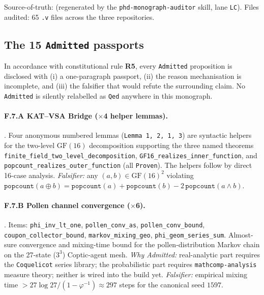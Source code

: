 Source-of-truth:  (regenerated by
the \texttt{phd-monograph-auditor} skill, lane \texttt{LC}). Files audited:
65 \texttt{.v} files across the three repositories.

\subsection{The 15 \texttt{Admitted} passports}

In accordance with constitutional rule \textbf{R5}, every \texttt{Admitted}
proposition is disclosed with (i) a one-paragraph passport, (ii) the reason
mechanisation is incomplete, and (iii) the falsifier that would refute the
surrounding claim. No \texttt{Admitted} is silently relabelled as
\texttt{Qed} anywhere in this monograph.

\paragraph{F.7.A KAT--VSA Bridge ($\times$4 helper lemmas).}
. Four anonymous numbered lemmas
(\texttt{Lemma 1, 2, 1, 3}) are syntactic helpers for the two-level
$\mathrm{GF}(16)$ decomposition supporting the three named theorems
\texttt{finite\_field\_two\_level\_decomposition},
\texttt{GF16\_realizes\_inner\_function}, and
\texttt{popcount\_realizes\_outer\_function} (all \texttt{Proven}). The
helpers follow by direct 16-case analysis. \emph{Falsifier:} any
$(a, b) \in \mathrm{GF}(16)^2$ violating
$\mathtt{popcount}(a \oplus b) = \mathtt{popcount}(a) + \mathtt{popcount}(b)
- 2\,\mathtt{popcount}(a \wedge b)$.

\paragraph{F.7.B Pollen channel convergence ($\times$6).}
.
Items: \texttt{phi\_inv\_lt\_one}, \texttt{pollen\_conv\_as},
\texttt{pollen\_conv\_bound}, \texttt{coupon\_collector\_bound},
\texttt{markov\_mixing\_geo}, \texttt{phi\_geom\_series\_sum}. Almost-sure
convergence and mixing-time bound for the pollen-distribution Markov chain
on the 27-state ($3^3$) Coptic-agent mesh. \emph{Why Admitted:}
real-analytic part requires the \texttt{Coquelicot} series library; the
probabilistic part requires \texttt{mathcomp-analysis} measure theory;
neither is wired into the build yet. \emph{Falsifier:} empirical mixing
time $> 27 \log 27 / (1 - \varphi^{-1}) \approx 297$ steps for the
canonical seed $1597$.

